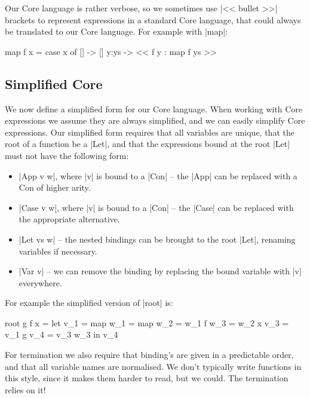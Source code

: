 \documentclass{sigplanconf}
\begin{document}
Our Core language is rather verbose, so we sometimes use |<< bullet >>| brackets to represent expressions in a standard Core language, that could always be translated to our Core language. For example with |map|:

\begin{code}
map f x = case x of
    [] -> []
    y:ys -> << f y : map f ys >>
\end{code}


\subsection{Simplified Core}
\label{sec:simplify}

We now define a simplified form for our Core language. When working with Core expressions we assume they are always simplified, and we can easily simplify Core expressions. Our simplified form requires that all variables are unique, that the root of a function be a |Let|, and that the expressions bound at the root |Let| must not have the following form:

\begin{itemize}
\item |App v w|, where |v| is bound to a |Con| -- the |App| can be replaced with a Con of higher arity.
\item |Case v w|, where |v| is bound to a |Con| -- the |Case| can be replaced with the appropriate alternative.
\item |Let vs w| -- the nested bindings can be brought to the root |Let|, renaming variables if necessary.
\item |Var v| -- we can remove the binding by replacing the bound variable with |v| everywhere.
\end{itemize}


For example the simplified version of |root| is:

\begin{code}
root g f x =  let  v_1 = map
                   w_1 = map
                   w_2 = w_1 f
                   w_3 = w_2 x
                   v_3 = v_1 g
                   v_4 = v_3 w_3
              in   v_4
\end{code}

For termination we also require that binding's are given in a predictable order, and that all variable names are normalised. We don't typically write functions in this style, since it makes them harder to read, but we could. The termination relies on it!
\end{document}
